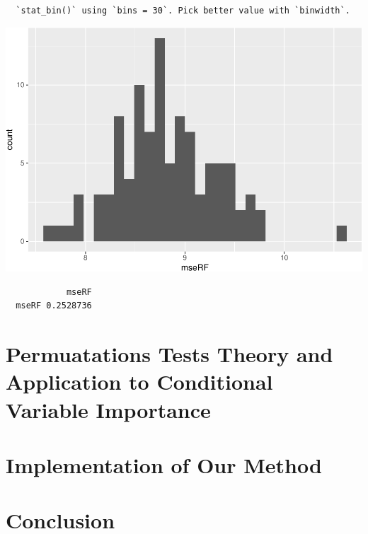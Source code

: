 \documentclass[12pt,twoside]{reedthesis}
\begin{document}
  \begin{verbatim}
  `stat_bin()` using `bins = 30`. Pick better value with `binwidth`.
  \end{verbatim}
  
  \begin{center}\includegraphics{Thesis_files/figure-latex/unnamed-chunk-4-1} \end{center}
  
  \begin{Shaded}
  \begin{Highlighting}[]
  \end{Highlighting}
  \end{Shaded}
  
  \begin{verbatim}
            mseRF
  mseRF 0.2528736
  \end{verbatim}
  
  \chapter{Permuatations Tests Theory and Application to Conditional
  Variable
  Importance}\label{permuatations-tests-theory-and-application-to-conditional-variable-importance}
  
  \chapter{Implementation of Our
  Method}\label{implementation-of-our-method}
  
  \chapter*{Conclusion}\label{conclusion}
  
\end{document}
